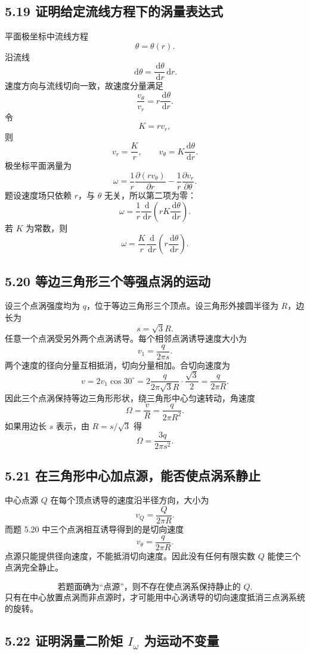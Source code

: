 \documentclass[UTF8,zihao=-4]{ctexart}
\newcommand{\dd}{\,\mathrm d}
\begin{document}
\subsection*{5.19 证明给定流线方程下的涡量表达式}

平面极坐标中流线方程
\[
\theta=\theta(r).
\]
沿流线
\[
\dd\theta=\frac{\dd\theta}{\dd r}\dd r.
\]
速度方向与流线切向一致，故速度分量满足
\[
\frac{v_\theta}{v_r}=r\frac{\dd\theta}{\dd r}.
\]
令
\[
K=rv_r ,
\]
则
\[
v_r=\frac{K}{r},\qquad
v_\theta=K\frac{\dd\theta}{\dd r}.
\]
极坐标平面涡量为
\[
\omega=\frac1r\frac{\partial(rv_\theta)}{\partial r}
-\frac1r\frac{\partial v_r}{\partial\theta}.
\]
题设速度场只依赖 \(r\)，与 \(\theta\) 无关，所以第二项为零：
\[
\omega=\frac1r\frac{\dd}{\dd r}
\left(rK\frac{\dd\theta}{\dd r}\right).
\]
若 \(K\) 为常数，则
\[
\boxed{
\omega=\frac{K}{r}\frac{\dd}{\dd r}
\left(r\frac{\dd\theta}{\dd r}\right).}
\]

\subsection*{5.20 等边三角形三个等强点涡的运动}

设三个点涡强度均为 \(q\)，位于等边三角形三个顶点。设三角形外接圆半径为 \(R\)，边长为
\[
s=\sqrt3R.
\]
任意一个点涡受另外两个点涡诱导。每个相邻点涡诱导速度大小为
\[
v_1=\frac{q}{2\pi s}.
\]
两个速度的径向分量互相抵消，切向分量相加。合切向速度为
\[
v=2v_1\cos30^\circ
=2\frac{q}{2\pi\sqrt3R}\cdot\frac{\sqrt3}{2}
=\frac{q}{2\pi R}.
\]
因此三个点涡保持等边三角形形状，绕三角形中心匀速转动，角速度
\[
\boxed{
\Omega=\frac{v}{R}=\frac{q}{2\pi R^2}.}
\]
如果用边长 \(s\) 表示，由 \(R=s/\sqrt3\) 得
\[
\boxed{\Omega=\frac{3q}{2\pi s^2}.}
\]

\subsection*{5.21 在三角形中心加点源，能否使点涡系静止}

中心点源 \(Q\) 在每个顶点诱导的速度沿半径方向，大小为
\[
v_Q=\frac{Q}{2\pi R}.
\]
而题 5.20 中三个点涡相互诱导得到的是切向速度
\[
v_\theta=\frac{q}{2\pi R}.
\]
点源只能提供径向速度，不能抵消切向速度。因此没有任何有限实数 \(Q\) 能使三个点涡完全静止。

\[
\boxed{\text{若题面确为“点源”，则不存在使点涡系保持静止的 }Q.}
\]
只有在中心放置点涡而非点源时，才可能用中心涡诱导的切向速度抵消三点涡系统的旋转。

\subsection*{5.22 证明涡量二阶矩 \(I_\omega\) 为运动不变量}
\end{document}
